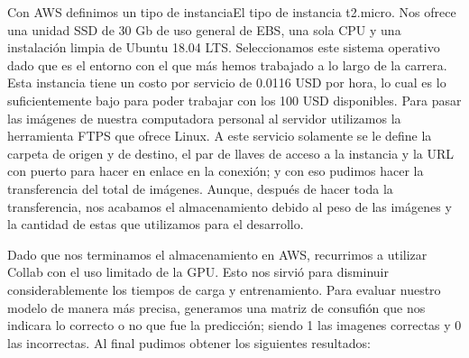 \documentclass{article}
\begin{document}
        Con AWS definimos un tipo de instanciaEl tipo de instancia t2.micro. Nos ofrece una unidad SSD de 30 Gb de uso general de EBS, una sola CPU y una instalación limpia de Ubuntu 18.04 LTS. Seleccionamos este sistema operativo dado que es el entorno con el que más hemos trabajado a lo largo de la carrera. Esta instancia tiene un costo por servicio de 0.0116 USD por hora, lo cual es lo suficientemente bajo para poder trabajar con los 100 USD disponibles. Para pasar las imágenes de nuestra computadora personal al servidor utilizamos la herramienta FTPS que ofrece Linux. A este servicio solamente se le define la carpeta de origen y de destino, el par de llaves de acceso a la instancia y la URL con puerto para hacer en enlace en la conexión; y con eso pudimos hacer la transferencia del total de imágenes. Aunque, después de hacer toda la transferencia, nos acabamos el almacenamiento debido al peso de las imágenes y la cantidad de estas que utilizamos para el desarrollo.

        Dado que nos terminamos el almacenamiento en AWS, recurrimos a utilizar Collab con el uso limitado de la GPU. Esto nos sirvió para disminuir considerablemente los tiempos de carga y entrenamiento. Para evaluar nuestro modelo de manera más precisa, generamos una matriz de consufión que nos indicara lo correcto o no que fue la predicción; siendo 1 las imagenes correctas y 0 las incorrectas. Al final pudimos obtener los siguientes resultados: \\
\end{document}
